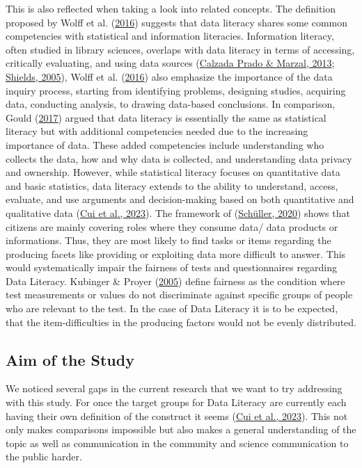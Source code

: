 \documentclass[
  12pt,
  a4paper,
  twoside]{article}
\begin{document}
This is also reflected when taking a look into related concepts.
The definition proposed by Wolff et al. (\protect\hyperlink{ref-wolff2016}{2016}) suggests that data literacy shares some common competencies with statistical and information literacies. Information literacy, often studied in library sciences, overlaps with data literacy in terms of accessing, critically evaluating, and using data sources (\protect\hyperlink{ref-prado2013}{Calzada Prado \& Marzal, 2013}; \protect\hyperlink{ref-shields2005}{Shields, 2005}), Wolff et al. (\protect\hyperlink{ref-wolff2016}{2016}) also emphasize the importance of the data inquiry process, starting from identifying problems, designing studies, acquiring data, conducting analysis, to drawing data-based conclusions.
In comparison, Gould (\protect\hyperlink{ref-gould2017}{2017}) argued that data literacy is essentially the same as statistical literacy but with additional competencies needed due to the increasing importance of data. These added competencies include understanding who collects the data, how and why data is collected, and understanding data privacy and ownership. However, while statistical literacy focuses on quantitative data and basic statistics, data literacy extends to the ability to understand, access, evaluate, and use arguments and decision-making based on both quantitative and qualitative data (\protect\hyperlink{ref-Cui2023}{Cui et al., 2023}).
The framework of (\protect\hyperlink{ref-schuxfcller2020}{Schüller, 2020}) shows that citizens are mainly covering roles where they consume data/ data products or informations.
Thus, they are most likely to find tasks or items regarding the producing facets like providing or exploiting data more difficult to answer. This would systematically impair the fairness of tests and questionnaires regarding Data Literacy. Kubinger \& Proyer (\protect\hyperlink{ref-kubinger2005}{2005}) define fairness as the condition where test measurements or values do not discriminate against specific groups of people who are relevant to the test. In the case of Data Literacy it is to be expected, that the item-difficulties in the producing factors would not be evenly distributed.

\hypertarget{aim-of-the-study}{%
\subsection{Aim of the Study}\label{aim-of-the-study}}

We noticed several gaps in the current research that we want to try addressing with this study. For once the target groups for Data Literacy are currently each having their own definition of the construct it seems (\protect\hyperlink{ref-Cui2023}{Cui et al., 2023}). This not only makes comparisons impossible but also makes a general understanding of the topic as well as communication in the community and science communication to the public harder.
\end{document}
